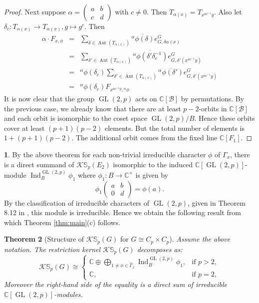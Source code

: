 \documentclass[12pt]{article}
\theoremstyle{plain}
\newtheorem{theorem}{Theorem}[section]
\theoremstyle{definition}
\newtheorem{nothing}[theorem]{}
\newcommand{\kerlin}{\mathbb S_p}
\newcommand{\ind}{\operatorname{Ind}}
\newcommand{\Aut}{\operatorname{Aut}}
\newcommand{\gl}{{\operatorname{GL}(2, p)}}
\begin{document}
\begin{proof}
Next suppose $\alpha = \begin{pmatrix}
    a&b\\c&d
\end{pmatrix}$ with $c\not = 0$. Then $T_{\alpha(x)} = T_{x^{ac^{-1}}y}$. Also let $\delta_c: T_{\alpha(x)}\to T_{\alpha(x)}, g\mapsto g^c$. Then 
\begin{eqnarray*}
  \alpha\cdot F_{x,\phi} &=& 
\sum_{\delta\in\Aut(T_{\alpha(x)})}\overline{{}^\alpha\phi(\delta)} e_{G, \delta\alpha(x)}^G\\
&=& \sum_{\delta'\in\Aut(T_{\alpha(x)})}\overline{{}^\alpha\phi(\delta'\delta_c^{-1})} e_{G, \delta'(x^{ac^{-1}}y)}^G\\
&=& {}^\alpha\phi(\delta_c)\sum_{\delta'\in\Aut(T_{\alpha(x)})}\overline{{}^\alpha\phi(\delta')} e_{G, \delta'(x^{ac^{-1}}y)}^G\\
&=& {}^\alpha\phi(\delta_c)F_{x^{ac^{-1}y}, {}^\alpha\phi}
\end{eqnarray*}
It is now clear that the group $\gl$ acts on $\mathbb C[\mathcal{B}]$ by permutations. By the previous case, we already know that there are at least $p-2$-orbits in $\mathbb C[\mathcal{B}]$ and each orbit is isomorphic to the coset space $\gl/B$. Hence these orbits cover at least $(p+1)(p-2)$ elements. But the total number of elements is $1+(p+1)(p-2)$. The additional orbit comes from the fixed line $\mathbb C[F_1]$. 

\end{proof}

\begin{nothing}
    By the above theorem for each non-trivial irreducible character $\phi$ of $\Gamma_x$, there is a direct summand of $\mathcal{K}\kerlin(E_2)$ isomorphic to the induced $\mathbb C[\gl]$-module $\ind_B^{\gl}\phi_1$ where $\phi_1: B\to \mathbb C^\times$ is given by 
    \[
    \phi_1\begin{pmatrix}
        a & b\\ 0& d
    \end{pmatrix} = \phi(a).
    \]
    By the classification of irreducible characters of $\gl$, given in Theorem 8.12 in \cite{Shapiro}, this module is irreducible. Hence we obtain the following result from which Theorem \ref{thm:main}(c) follows.
\end{nothing}
\begin{theorem}[Structure of \( \mathcal{K}\kerlin(G) \) for \( G \cong C_p \times C_p \)]\label{thm:cpcpfinal2}
    Assume the above notation. 
    The restriction kernel \( \mathcal{K}\kerlin(G) \) decomposes as:
\[
\mathcal{K}\kerlin(G) \cong \begin{cases}
\mathbb{C} \oplus \bigoplus_{1\neq \phi\in \hat\Gamma_x} \ind_B^{\gl}\phi_1, & \text{if } p > 2, \\
\mathbb{C}, & \text{if } p = 2,
\end{cases}
\]
Moreover the right-hand side of the equality is a direct sum of irreducible $\mathbb C[\gl]$-modules.
\end{theorem}
\end{document}
